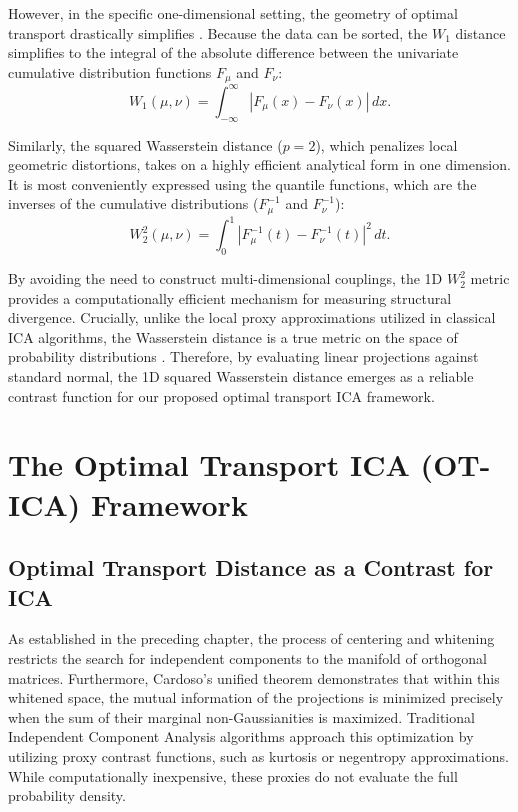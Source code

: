 \documentclass[12pt,a4paper,twoside,openany]{book}
\begin{document}
However, in the specific one-dimensional setting, the geometry of optimal transport drastically simplifies \cite[Chapter 2]{villani2003}. 
Because the data can be sorted, the $W_1$ distance simplifies to the integral of 
the absolute difference between the univariate cumulative distribution functions $F_\mu$ and $F_\nu$:
\begin{equation}
    W_1(\mu, \nu) = \int_{-\infty}^\infty |F_\mu(x) - F_\nu(x)| \, dx.
\end{equation}

Similarly, the squared Wasserstein distance ($p=2$), which penalizes local geometric distortions, 
takes on a highly efficient analytical form in one dimension. It is most conveniently expressed using the quantile functions, 
which are the inverses of the cumulative distributions ($F_\mu^{-1}$ and $F_\nu^{-1}$):
\begin{equation}
    W_2^2(\mu, \nu) = \int_0^1 |F_\mu^{-1}(t) - F_\nu^{-1}(t)|^2 \, dt.
\end{equation}

By avoiding the need to construct multi-dimensional couplings, the 1D $W_2^2$ metric provides 
a computationally efficient mechanism for measuring structural divergence. Crucially, unlike the local proxy approximations utilized 
in classical ICA algorithms, the Wasserstein distance is a true metric on the space of probability distributions \cite[Chapter 7]{villani2003}. 
Therefore, by evaluating linear projections against standard normal, the 1D squared Wasserstein distance emerges as a reliable 
contrast function for our proposed optimal transport ICA framework.

\chapter{The Optimal Transport ICA (OT-ICA) Framework}

\section{Optimal Transport Distance as a Contrast for ICA}
As established in the preceding chapter, the process of centering and whitening restricts the search for independent 
components to the manifold of orthogonal matrices. Furthermore, Cardoso's unified theorem \cite{cardoso2022} demonstrates 
that within this whitened space, the mutual information of the projections is minimized precisely when the sum of their 
marginal non-Gaussianities is maximized. Traditional Independent Component Analysis algorithms approach this optimization 
by utilizing proxy contrast functions, such as kurtosis or negentropy approximations. While computationally inexpensive, 
these proxies do not evaluate the full probability density.
\end{document}
